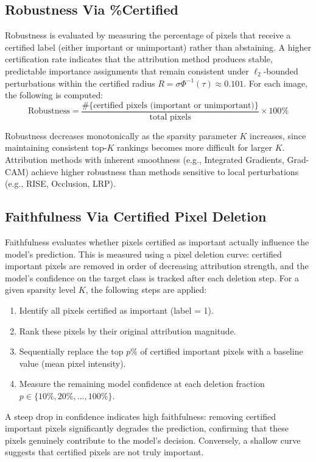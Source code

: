 \documentclass[11pt]{article}
\begin{document}
\subsection{Robustness Via \%Certified}

Robustness is evaluated by measuring the percentage of pixels that receive a certified label (either important or unimportant) rather than abstaining. A higher certification rate indicates that the attribution method produces stable, predictable importance assignments that remain consistent under $\ell_2$-bounded perturbations within the certified radius $R = \sigma \Phi^{-1}(\tau) \approx 0.101$.
For each image, the following is computed:
$$
\text{Robustness} = \frac{\#\{\text{certified pixels (important or unimportant)}\}}{\text{total pixels}} \times 100\%
$$

Robustness decreases monotonically as the sparsity parameter $K$ increases, since maintaining consistent top-$K$ rankings becomes more difficult for larger $K$. Attribution methods with inherent smoothness (e.g., Integrated Gradients, Grad-CAM) achieve higher robustness than methods sensitive to local perturbations (e.g., RISE, Occlusion, LRP).

\subsection{Faithfulness Via Certified Pixel Deletion}

Faithfulness evaluates whether pixels certified as important actually influence the model's prediction. This is measured using a pixel deletion curve: certified important pixels are removed in order of decreasing attribution strength, and the model's confidence on the target class is tracked after each deletion step.
For a given sparsity level $K$, the following steps are applied:
\begin{enumerate}
\item Identify all pixels certified as important (label = 1).
\item Rank these pixels by their original attribution magnitude.
\item Sequentially replace the top $p\%$ of certified important pixels with a baseline value (mean pixel intensity).
\item Measure the remaining model confidence at each deletion fraction $p \in \{10\%, 20\%, ..., 100\%\}$.
\end{enumerate}

A steep drop in confidence indicates high faithfulness: removing certified important pixels significantly degrades the prediction, confirming that these pixels genuinely contribute to the model's decision. Conversely, a shallow curve suggests that certified pixels are not truly important.
\end{document}
